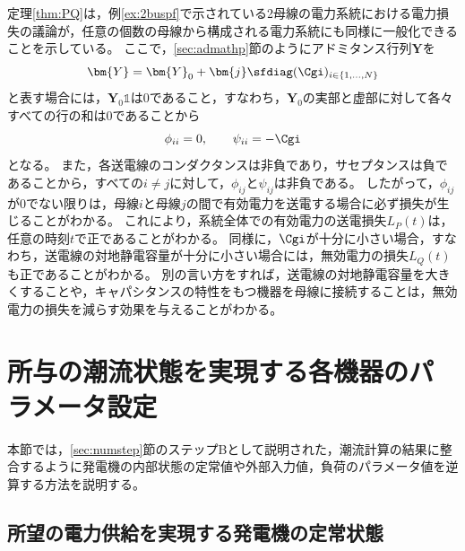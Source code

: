 \documentclass[tombow,dvipdfmx]{corona-a5-1.1}
\begin{document}
定理\ref{thm:PQ}は，例\ref{ex:2buspf}で示されている2母線の電力系統における電力損失の議論が，任意の個数の母線から構成される電力系統にも同様に一般化できることを示している。
ここで，\ref{sec:admathp}節のようにアドミタンス行列$\bm{Y}$を
\[
\bm{Y}=\bm{Y}_0 + \bm{j} \sfdiag(\Cgi)_{i\in \{1,\ldots,N\} }
\]
と表す場合には，$\bm{Y}_0 \mathds{1}$は0であること，すなわち，$\bm{Y}_0$の実部と虚部に対して各々すべての行の和は0であることから
\[
\phi_{ii}=0,\qquad
\psi_{ii}= - \Cgi
\]
となる。
また，各送電線のコンダクタンスは非負であり，サセプタンスは負であることから，すべての$i\neq j$に対して，$\phi_{ij} $と$\psi_{ij}$は非負である。
したがって，$\phi_{ij}$が0でない限りは，母線$i$と母線$j$の間で有効電力を送電する場合に必ず損失が生じることがわかる。
これにより，系統全体での有効電力の送電損失$L_P(t)$は，任意の時刻$t$で正であることがわかる。
同様に，$\Cgi$が十分に小さい場合，すなわち，送電線の対地静電容量が十分に小さい場合には，無効電力の損失$L_Q(t)$も正であることがわかる。
別の言い方をすれば，送電線の対地静電容量を大きくすることや，キャパシタンスの特性をもつ機器を母線に接続することは，無効電力の損失を減らす効果を与えることがわかる。



\section{所与の潮流状態を実現する各機器のパラメータ設定}\label{sec:paradef}

本節では，\ref{sec:numstep}節のステップBとして説明された，潮流計算の結果に整合するように発電機の内部状態の定常値や外部入力値，負荷のパラメータ値を逆算する方法を説明する。


\subsection{所望の電力供給を実現する発電機の定常状態}\label{sec:stagen}
\end{document}
